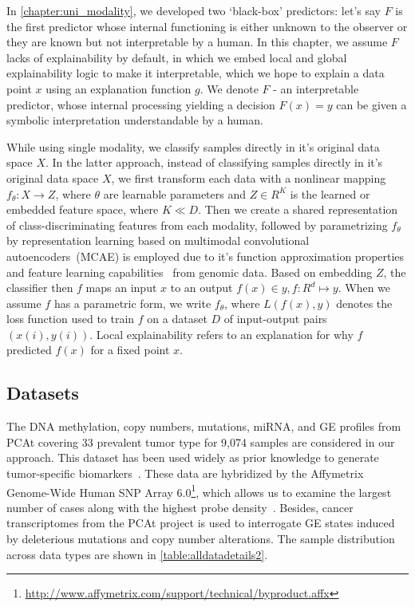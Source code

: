 \hspace*{3.5mm} In \cref{chapter:uni_modality}, we developed two `black-box' predictors: let's say $F$ is the first predictor whose internal functioning is either unknown to the observer or they are known but not interpretable by a human. In this chapter, we assume $F$ lacks of explainability by default, in which we embed local and global explainability logic to make it interpretable, which we hope to explain a data point $x$ using an explanation function $g$. We denote ${F}$ - an interpretable predictor, whose internal processing yielding a decision ${F}(x)=y$ can be given a symbolic interpretation understandable by a human. 

\hspace*{3.5mm} While using single modality, we classify samples directly in it's original data space $X$. In the latter approach, instead of classifying samples directly in it's original data space $X$, we first transform each data with a nonlinear mapping $f_{\theta}: X \rightarrow Z$, where $\theta$ are learnable parameters and $Z \in {R}^{K}$ is the learned or embedded feature space, where $K \ll D$. Then we create a shared representation of class-discriminating features from each modality, followed by parametrizing $f_{\theta}$ by representation learning based on multimodal convolutional autoencoders~(MCAE) is employed due to it's function approximation properties and feature learning capabilities~\cite{xie2016unsupervised,karim2019drug} from genomic data. Based on embedding $Z$, the classifier then $f$ maps an input $x$ to an output $f(x) \in y, f: {R}^{d} \mapsto y$. When we assume $f$ has a parametric form, we write $f_{\theta}$, where ${L}(f(x), y)$ denotes the loss function used to train $f$ on a dataset $D$ of input-output pairs $(x(i), y(i))$. Local explainability refers to an explanation for why $f$ predicted $f(x)$ for a fixed point $x$. 

\subsection{Datasets}
The DNA methylation, copy numbers, mutations, miRNA, and GE profiles from PCAt covering 33 prevalent tumor type for 9,074 samples are considered in our approach. This dataset has been used widely as prior knowledge to generate tumor-specific biomarkers~\cite{way2018machine,hoadley2018cell,malta2018machine}. These data are hybridized by the Affymetrix Genome-Wide Human SNP Array 6.0\footnote{\url{http://www.affymetrix.com/support/technical/byproduct.affx}}, which allows us to examine the largest number of cases along with the highest probe density~\cite{31Park}. Besides, cancer transcriptomes from the PCAt project is used to interrogate GE states induced by deleterious mutations and copy number alterations. The sample distribution across data types are shown in \cref{table:alldatadetails2}. %

